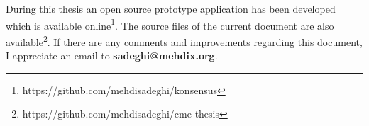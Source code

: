 During this thesis an open source prototype application has been developed which is available
online\footnote{https://github.com/mehdisadeghi/konsensus}. The source files
of the current document are also available\footnote{https://github.com/mehdisadeghi/cme-thesis}.
If there are any comments and improvements regarding this document, I
appreciate an email to \textbf{sadeghi@mehdix.org}.

